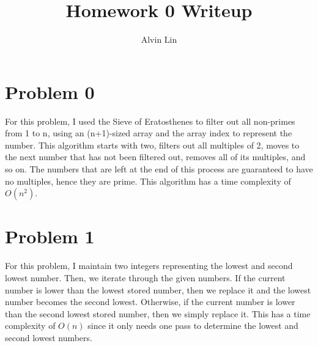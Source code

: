 \documentclass[letterpaper, 12pt]{article}
\title{Homework 0 Writeup}
\author{Alvin Lin}
\begin{document}
\maketitle

\section*{Problem 0}
For this problem, I used the Sieve of Eratosthenes to filter out all non-primes from 1 to n,
using an (n+1)-sized array and the array index to represent the number. This algorithm starts with two,
filters out all multiples of 2, moves to the next number that has not been filtered out, removes all
of its multiples, and so on. The numbers that are left at the end of this process are guaranteed to
have no multiples, hence they are prime. This algorithm has a time complexity of \( O(n^2) \).

\section*{Problem 1}
For this problem, I maintain two integers representing the lowest and second lowest number. Then, we
iterate through the given numbers. If the current number is lower than the lowest stored number, then
we replace it and the lowest number becomes the second lowest. Otherwise, if the current number is
lower than the second lowest stored number, then we simply replace it. This has a time complexity
of \( O(n) \) since it only needs one pass to determine the lowest and second lowest numbers.
\end{document}
